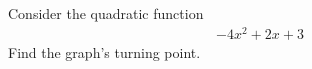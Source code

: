 Consider the quadratic function
\begin{align*}
-4x^2 + 2x + 3
\end{align*}
Find the graph's turning point. 
